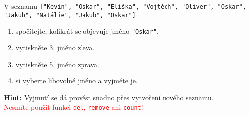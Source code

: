\question[50]
V seznamu \texttt{["Kevin", "Oskar", "Eliška", "Vojtěch", "Oliver", "Oskar",
			"Jakub", "Natálie", "Jakub", "Oskar"]}
\begin{enumerate}[label=(\alph*)]
	\item spočítejte, kolikrát se objevuje jméno \texttt{"Oskar"}.
	\item vytiskněte 3. jméno zleva.
	\item vytiskněte 5. jméno zprava.
	\item si vyberte libovolné jméno a vyjměte je.
\end{enumerate}
\textbf{Hint:} Vyjmutí se dá provést snadno přes vytvoření nového seznamu.\\
\textcolor{red}{Nesmíte použít funkci \texttt{del}, \texttt{remove} ani \texttt{count}!}